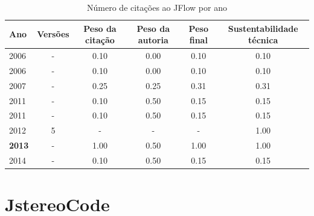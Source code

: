 \begin{table}[H]
\caption{Número de citações ao JFlow por ano}
\centering
\begin{tabular}{| l | c | c | c | c | c |}
  \hline
  Ano & Versões & Peso da citação & Peso da autoria & Peso final & Sustentabilidade técnica \\
  \hline
            2006
          &
          -
          &
          0.10
          &
          0.00
          &
          0.10
          &
            {\color{red} 0.10}
          \\
            2006
          &
          -
          &
          0.10
          &
          0.00
          &
          0.10
          &
            {\color{red} 0.10}
          \\
\hline
            2007
          &
          -
          &
          0.25
          &
          0.25
          &
          0.31
          &
            {\color{red} 0.31}
          \\
\hline
            2011
          &
          -
          &
          0.10
          &
          0.50
          &
          0.15
          &
            {\color{red} 0.15}
          \\
            2011
          &
          -
          &
          0.10
          &
          0.50
          &
          0.15
          &
            {\color{red} 0.15}
          \\
\hline
        2012 & 5 & - & - & -
        &
          {\color{blue} 1.00}
        \\
\hline
            {\bf 2013}
          &
          -
          &
          1.00
          &
          0.50
          &
          1.00
          &
            {\color{blue} 1.00}
          \\
\hline
            2014
          &
          -
          &
          0.10
          &
          0.50
          &
          0.15
          &
            {\color{red} 0.15}
          \\
\hline
\end{tabular}
\end{table}



\section{JstereoCode}


